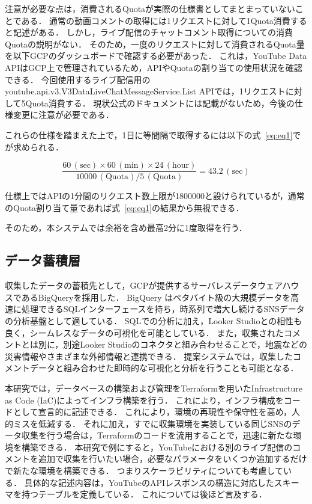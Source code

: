   注意が必要な点は，消費されるQuotaが実際の仕様書としてまとまっていないことである．
  通常の動画コメントの取得には1リクエストに対して1Quota消費すると記述がある．
  しかし，ライブ配信のチャットコメント取得についての消費Quotaの説明がない．
  そのため，一度のリクエストに対して消費されるQuota量を以下GCPのダッシュボードで確認する必要があった．
  これは，YouTube Data APIはGCP上で管理されているため，APIやQuotaの割り当ての使用状況を確認できる．
  今回使用するライブ配信用のyoutube.api.v3.V3DataLiveChatMessageService.List APIでは，1リクエストに対して5Quota消費する．
  現状公式のドキュメントには記載がないため，今後の仕様変更に注意が必要である．

  これらの仕様を踏まえた上で，1日に等間隔で取得するには以下の式~\eqref{eq:eq1}でが求められる．

  \begin{equation}
      \frac{60\,(\mathrm{sec}) \times 60\,(\mathrm{min}) \times 24\,(\mathrm{hour})}{{10000\,(\mathrm{Quota})}/{5\,(\mathrm{Quota})}}
      = 43.2\,(\mathrm{sec}) \label{eq:eq1}
  \end{equation}
  
  仕様上ではAPIの1分間のリクエスト数上限が1800000と設けられているが，通常のQuota割り当て量であれば式~\eqref{eq:eq1}の結果から無視できる．

  そのため，本システムでは余裕を含め最高2分に1度取得を行う．


  \subsection{データ蓄積層}
  収集したデータの蓄積先として，GCPが提供するサーバレスデータウェアハウスであるBigQueryを採用した．
  BigQuery はペタバイト級の大規模データを高速に処理できるSQLインターフェースを持ち，時系列で増大し続けるSNSデータの分析基盤として適している．
  SQLでの分析に加え，Looker Studioとの相性も良く，シームレスなデータの可視化を可能としている．
  また，収集されたコメントとは別に，別途Looker Studioのコネクタと組み合わせることで，地震などの災害情報やさまざまな外部情報と連携できる．
  提案システムでは，収集したコメントデータと組み合わせた即時的な可視化と分析を行うことも可能となる．

  本研究では，データベースの構築および管理をTerraform\cite{TerraformIntro_HashiCorp2026}を用いたInfrastructure as Code\cite{infrastructure_as_code, Pahl2025Infrastructure}
  (IaC)によってインフラ構築を行う． これにより，インフラ構成をコードとして宣言的に記述できる．
  これにより，環境の再現性や保守性を高め，人的ミスを低減する．
  それに加え，すでに収集環境を実装している同じSNSのデータ収集を行う場合は，Terraformのコードを流用することで，迅速に新たな環境を構築できる．
  本研究で例にすると，YouTubeにおける別のライブ配信のコメントを追加で収集を行いたい場合，必要なパラメータをいくつか追加するだけで新たな環境を構築できる．
  つまりスケーラビリティについても考慮している．
  具体的な記述内容は，YouTubeのAPIレスポンスの構造に対応したスキーマを持つテーブルを定義している．
  これについては後ほど言及する．
  

